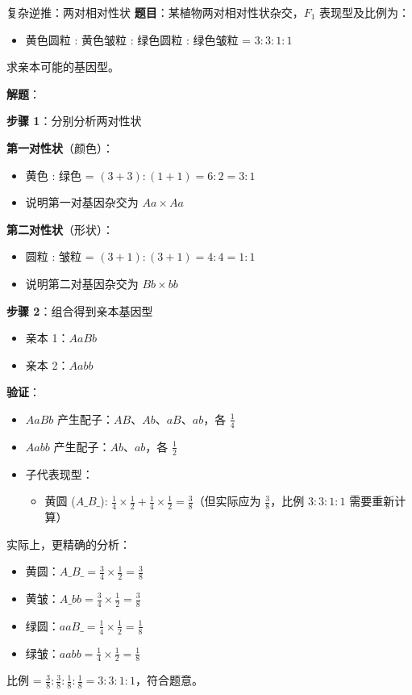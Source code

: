 \documentclass[a4paper,11pt]{ctexart}
\begin{document}
\begin{examplebox}{复杂逆推：两对相对性状}
\textbf{题目}：某植物两对相对性状杂交，$F_1$ 表现型及比例为：
\begin{itemize}[leftmargin=2em]
    \item 黄色圆粒 : 黄色皱粒 : 绿色圆粒 : 绿色皱粒 = $3:3:1:1$
\end{itemize}

求亲本可能的基因型。

\textbf{解题}：

\textbf{步骤 1}：分别分析两对性状

\textbf{第一对性状}（颜色）：
\begin{itemize}[leftmargin=2em]
    \item 黄色 : 绿色 = $(3+3):(1+1) = 6:2 = 3:1$
    \item 说明第一对基因杂交为 $Aa \times Aa$
\end{itemize}

\textbf{第二对性状}（形状）：
\begin{itemize}[leftmargin=2em]
    \item 圆粒 : 皱粒 = $(3+1):(3+1) = 4:4 = 1:1$
    \item 说明第二对基因杂交为 $Bb \times bb$
\end{itemize}

\textbf{步骤 2}：组合得到亲本基因型
\begin{itemize}[leftmargin=2em]
    \item 亲本 1：$AaBb$
    \item 亲本 2：$Aabb$
\end{itemize}

\textbf{验证}：
\begin{itemize}[leftmargin=2em]
    \item $AaBb$ 产生配子：$AB$、$Ab$、$aB$、$ab$，各 $\frac{1}{4}$
    \item $Aabb$ 产生配子：$Ab$、$ab$，各 $\frac{1}{2}$
    \item 子代表现型：
        \begin{itemize}
            \item 黄圆 ($A\_B\_$): $\frac{1}{4} \times \frac{1}{2} + \frac{1}{4} \times \frac{1}{2} = \frac{3}{8}$（但实际应为 $\frac{3}{8}$，比例 $3:3:1:1$ 需要重新计算）
        \end{itemize}
\end{itemize}

实际上，更精确的分析：
\begin{itemize}[leftmargin=2em]
    \item 黄圆：$A\_B\_ = \frac{3}{4} \times \frac{1}{2} = \frac{3}{8}$
    \item 黄皱：$A\_bb = \frac{3}{4} \times \frac{1}{2} = \frac{3}{8}$
    \item 绿圆：$aaB\_ = \frac{1}{4} \times \frac{1}{2} = \frac{1}{8}$
    \item 绿皱：$aabb = \frac{1}{4} \times \frac{1}{2} = \frac{1}{8}$
\end{itemize}

比例 = $\frac{3}{8} : \frac{3}{8} : \frac{1}{8} : \frac{1}{8} = 3:3:1:1$，符合题意。
\end{examplebox}
\end{document}
